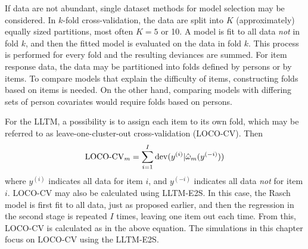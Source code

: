 If data are not abundant, single dataset methods for model selection may be considered. In $k$-fold cross-validation, the data are split into $K$ (approximately) equally sized partitions, most often $K=5$ or 10. 
A model is fit to all data \emph{not} in fold $k$, and then the fitted model is evaluated on the data in fold $k$. 
This process is performed for every fold and the resulting deviances are summed. For item response data, the data may be partitioned into folds defined by persons or by items.
To compare models that explain the difficulty of items, constructing folds based on items is needed.
On the other hand, comparing models with differing sets of person covariates \parencite[see for example][]{Adams1997b} would require folds based on persons.

For the LLTM, a possibility is to assign each item to its own fold, which may be referred to as leave-one-cluster-out cross-validation (LOCO-CV). Then
\begin{equation}
	\mathrm{LOCO\textnormal{-}CV}_m = \sum_{i=1}^{I} \mathrm{dev}(y^{(i)} | \hat \omega_m( y^{(-i)}))
\end{equation}
where $y^{(i)}$ indicates all data for item $i$, and $y^{(-i)}$ indicates all data \emph{not} for item $i$. LOCO-CV may also be calculated using LLTM-E2S. In this case, the Rasch model is first fit to all data, just as proposed earlier, and then the regression in the second stage is repeated $I$ times, leaving one item out each time. From this, LOCO-CV is calculated as in the above equation. The simulations in this chapter focus on LOCO-CV using the LLTM-E2S.


